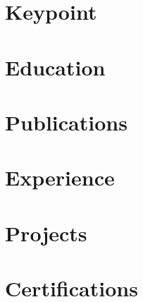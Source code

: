 \documentclass[10pt, letterpaper]{article}
\begin{document}
	
	
	
	
	\section{\faStar \ Keypoint}
	
	
	\section{\faUniversity\ Education}
	
	
	\section{\faNewspaper\ Publications}
	
	
	\section{\faBriefcase\ Experience}
	
	
	\section{\faCode\ Projects}
	
	
	\section{\faCertificate\ Certifications}
	
	
%	
	
\end{document}
